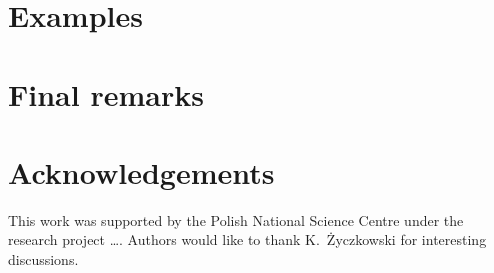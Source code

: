 \documentclass[11pt,a4paper]{article}
\newcommand{\1}{{\bf 1}}
\begin{document}
\section{Examples}

\section{Final remarks}

\section{Acknowledgements}
This work was supported by the Polish National Science Centre under the research
project \dots. Authors would like to thank K.~\.Zyczkowski for interesting
discussions.



\end{document}
